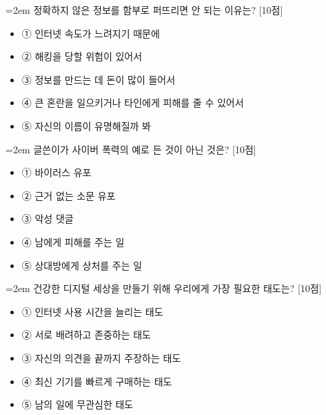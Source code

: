 \documentclass[12pt,a4paper]{article}
\newcommand{\qnum}[1]{%
  \tikz[baseline=(num.base)]{%
    \node[circle, fill=numCircle, text=white, inner sep=0pt,
          minimum size=18pt, font=\small\bfseries] (num) {#1};%
  }%
}
\newcommand{\pts}[1]{%
  \hfill\textcolor{ptsBadge}{[#1점]}%
}
\begin{document}
\vspace{4mm}
\begin{minipage}{\columnwidth}
{\hangindent=2em
\qnum{28}\enspace 정확하지 않은 정보를 함부로 퍼뜨리면 안 되는 이유는? \pts{10}
\par}

\vspace{3mm}
\begin{itemize}[leftmargin=2.5em, labelsep=0.3em, label={}, itemsep=4pt, parsep=1pt, topsep=0pt]
  \item ① 인터넷 속도가 느려지기 때문에
  \item ② 해킹을 당할 위험이 있어서
  \item ③ 정보를 만드는 데 돈이 많이 들어서
  \item ④ 큰 혼란을 일으키거나 타인에게 피해를 줄 수 있어서
  \item ⑤ 자신의 이름이 유명해질까 봐
\end{itemize}
\end{minipage}
\vspace{4mm}

\vspace{4mm}
\begin{minipage}{\columnwidth}
{\hangindent=2em
\qnum{29}\enspace 글쓴이가 사이버 폭력의 예로 든 것이 아닌 것은? \pts{10}
\par}

\vspace{3mm}
\begin{itemize}[leftmargin=2.5em, labelsep=0.3em, label={}, itemsep=4pt, parsep=1pt, topsep=0pt]
  \item ① 바이러스 유포
  \item ② 근거 없는 소문 유포
  \item ③ 악성 댓글
  \item ④ 남에게 피해를 주는 일
  \item ⑤ 상대방에게 상처를 주는 일
\end{itemize}
\end{minipage}
\vspace{4mm}

\vspace{4mm}
\begin{minipage}{\columnwidth}
{\hangindent=2em
\qnum{30}\enspace 건강한 디지털 세상을 만들기 위해 우리에게 가장 필요한 태도는? \pts{10}
\par}

\vspace{3mm}
\begin{itemize}[leftmargin=2.5em, labelsep=0.3em, label={}, itemsep=4pt, parsep=1pt, topsep=0pt]
  \item ① 인터넷 사용 시간을 늘리는 태도
  \item ② 서로 배려하고 존중하는 태도
  \item ③ 자신의 의견을 끝까지 주장하는 태도
  \item ④ 최신 기기를 빠르게 구매하는 태도
  \item ⑤ 남의 일에 무관심한 태도
\end{itemize}
\end{minipage}
\vspace{4mm}
\end{document}
